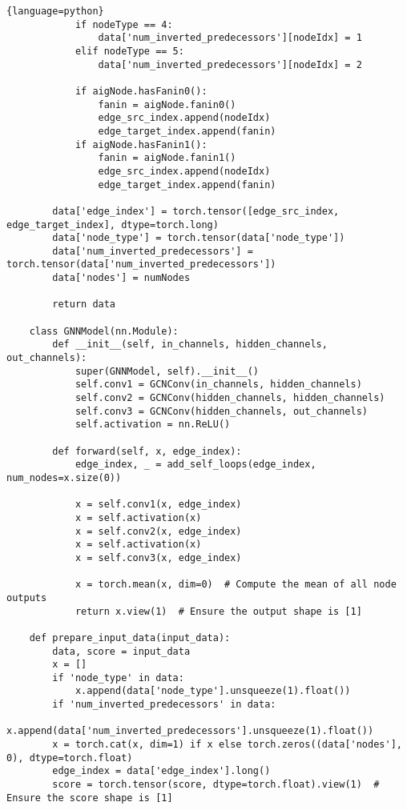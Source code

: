\documentclass[UTF8]{ctexart}
\begin{document}
\begin{lstlisting}{language=python}
            if nodeType == 4:
                data['num_inverted_predecessors'][nodeIdx] = 1
            elif nodeType == 5:
                data['num_inverted_predecessors'][nodeIdx] = 2
    
            if aigNode.hasFanin0():
                fanin = aigNode.fanin0()
                edge_src_index.append(nodeIdx)
                edge_target_index.append(fanin)
            if aigNode.hasFanin1():
                fanin = aigNode.fanin1()
                edge_src_index.append(nodeIdx)
                edge_target_index.append(fanin)
    
        data['edge_index'] = torch.tensor([edge_src_index, edge_target_index], dtype=torch.long)
        data['node_type'] = torch.tensor(data['node_type'])
        data['num_inverted_predecessors'] = torch.tensor(data['num_inverted_predecessors'])
        data['nodes'] = numNodes
    
        return data
    
    class GNNModel(nn.Module):
        def __init__(self, in_channels, hidden_channels, out_channels):
            super(GNNModel, self).__init__()
            self.conv1 = GCNConv(in_channels, hidden_channels)
            self.conv2 = GCNConv(hidden_channels, hidden_channels)
            self.conv3 = GCNConv(hidden_channels, out_channels)
            self.activation = nn.ReLU()
    
        def forward(self, x, edge_index):
            edge_index, _ = add_self_loops(edge_index, num_nodes=x.size(0))
            
            x = self.conv1(x, edge_index)
            x = self.activation(x)
            x = self.conv2(x, edge_index)
            x = self.activation(x)
            x = self.conv3(x, edge_index)
            
            x = torch.mean(x, dim=0)  # Compute the mean of all node outputs
            return x.view(1)  # Ensure the output shape is [1]
    
    def prepare_input_data(input_data):
        data, score = input_data
        x = []
        if 'node_type' in data:
            x.append(data['node_type'].unsqueeze(1).float())
        if 'num_inverted_predecessors' in data:
            x.append(data['num_inverted_predecessors'].unsqueeze(1).float())
        x = torch.cat(x, dim=1) if x else torch.zeros((data['nodes'], 0), dtype=torch.float)
        edge_index = data['edge_index'].long()
        score = torch.tensor(score, dtype=torch.float).view(1)  # Ensure the score shape is [1]
    

\end{lstlisting}
\end{document}
